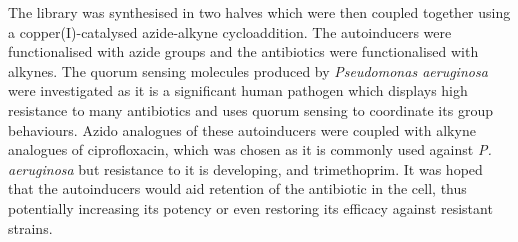 The library was synthesised in two halves which were then coupled together using a copper(I)-catalysed azide-alkyne cycloaddition\cite{Tornoe2002,ANIE:ANIE2596}. The autoinducers were functionalised with azide groups and the antibiotics were functionalised with alkynes. The quorum sensing molecules produced by \textit{Pseudomonas aeruginosa} were investigated as it is a significant human pathogen\cite{Bodey1983} which displays high resistance to many antibiotics\cite{Poole2004} and uses quorum sensing to coordinate its group behaviours\cite{Dubern2008}. Azido analogues of these autoinducers were coupled with alkyne analogues of ciprofloxacin, which was chosen as it is commonly used against \textit{P. aeruginosa}\cite{Macgowan1999} but resistance to it is developing\cite{Su2010}, and trimethoprim. It was hoped that the autoinducers would aid retention of the antibiotic in the cell, thus potentially increasing its potency or even restoring its efficacy against resistant strains.

\newpage